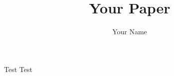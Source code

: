 \documentclass{article}
\title{Your Paper}
\author{Your Name}
\begin{document}
\maketitle
Test Test
\end{document}
